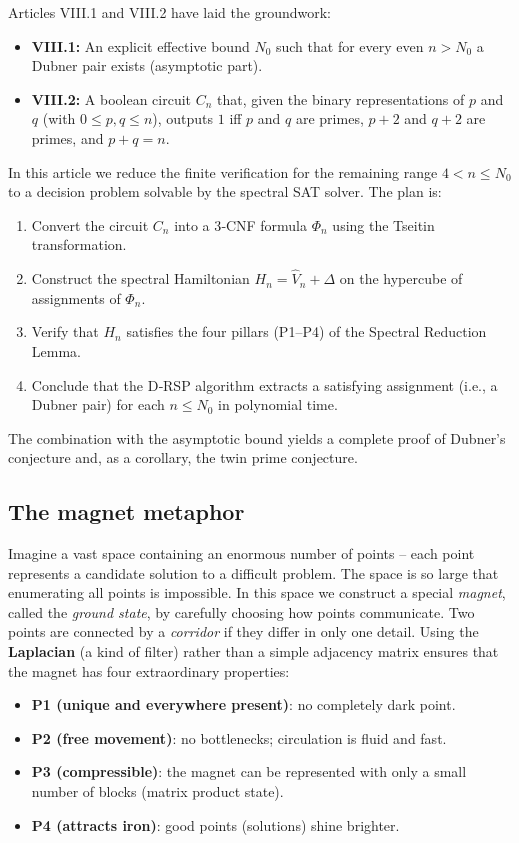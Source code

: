 \documentclass[11pt,a4paper]{article}
\begin{document}
Articles VIII.1 and VIII.2 have laid the groundwork:
\begin{itemize}
\item \textbf{VIII.1:} An explicit effective bound \(N_0\) such that for every even \(n > N_0\) a Dubner pair exists (asymptotic part).
\item \textbf{VIII.2:} A boolean circuit \(C_n\) that, given the binary representations of \(p\) and \(q\) (with \(0\le p,q\le n\)), outputs \(1\) iff \(p\) and \(q\) are primes, \(p+2\) and \(q+2\) are primes, and \(p+q=n\).
\end{itemize}
In this article we reduce the finite verification for the remaining range \(4 < n \le N_0\) to a decision problem solvable by the spectral SAT solver. The plan is:
\begin{enumerate}
\item Convert the circuit \(C_n\) into a 3‑CNF formula \(\Phi_n\) using the Tseitin transformation.
\item Construct the spectral Hamiltonian \(H_n = \hat{V}_n + \Delta\) on the hypercube of assignments of \(\Phi_n\).
\item Verify that \(H_n\) satisfies the four pillars (P1–P4) of the Spectral Reduction Lemma.
\item Conclude that the D‑RSP algorithm extracts a satisfying assignment (i.e., a Dubner pair) for each \(n \le N_0\) in polynomial time.
\end{enumerate}
The combination with the asymptotic bound yields a complete proof of Dubner's conjecture and, as a corollary, the twin prime conjecture.

\subsection{The magnet metaphor}

Imagine a vast space containing an enormous number of points – each point represents a candidate solution to a difficult problem. The space is so large that enumerating all points is impossible. In this space we construct a special \emph{magnet}, called the \emph{ground state}, by carefully choosing how points communicate. Two points are connected by a \emph{corridor} if they differ in only one detail. Using the \textbf{Laplacian} (a kind of filter) rather than a simple adjacency matrix ensures that the magnet has four extraordinary properties:

\begin{itemize}
\item \textbf{P1 (unique and everywhere present)}: no completely dark point.
\item \textbf{P2 (free movement)}: no bottlenecks; circulation is fluid and fast.
\item \textbf{P3 (compressible)}: the magnet can be represented with only a small number of blocks (matrix product state).
\item \textbf{P4 (attracts iron)}: good points (solutions) shine brighter.
\end{itemize}
\end{document}
